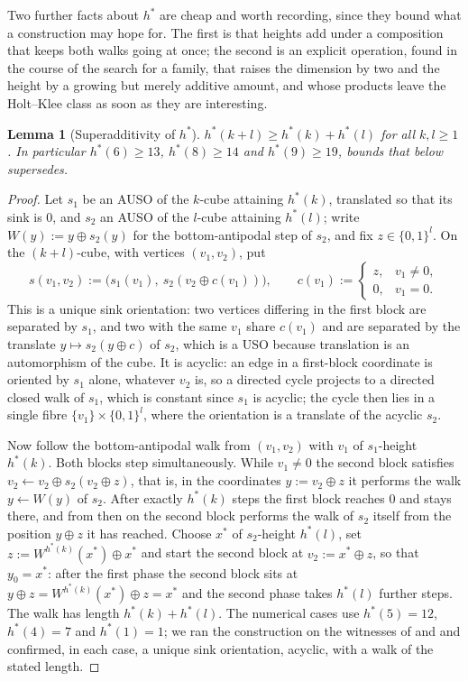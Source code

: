 \documentclass[11pt]{article}
\theoremstyle{plain}
\newtheorem{lemma}[theorem]{Lemma}
\theoremstyle{definition}
\begin{document}
Two further facts about $h^{\ast}$ are cheap and worth recording, since
they bound what a construction may hope for. The first is that heights add
under a composition that keeps both walks going at once; the second is an
explicit operation, found in the course of the search for a family, that
raises the dimension by two and the height by a growing but merely
additive amount, and whose products leave the Holt--Klee class as soon as
they are interesting.

\begin{lemma}[Superadditivity of $h^{\ast}$]\label{lem:hstar-super}
$h^{\ast}(k+l)\ge h^{\ast}(k)+h^{\ast}(l)$ for all $k,l\ge1$. In particular
$h^{\ast}(6)\ge13$, $h^{\ast}(8)\ge14$ and $h^{\ast}(9)\ge19$, bounds that
 below supersedes.
\end{lemma}

\begin{proof}
Let $s_1$ be an AUSO of the $k$-cube attaining $h^{\ast}(k)$, translated so
that its sink is $0$, and $s_2$ an AUSO of the $l$-cube attaining
$h^{\ast}(l)$; write $W(y):=y\oplus s_2(y)$ for the bottom-antipodal step of
$s_2$, and fix $z\in\{0,1\}^{l}$. On the $(k+l)$-cube, with vertices
$(v_1,v_2)$, put
\[
  s(v_1,v_2):=\bigl(s_1(v_1),\ s_2(v_2\oplus c(v_1))\bigr),\qquad
  c(v_1):=\begin{cases}z,&v_1\ne0,\\0,&v_1=0.\end{cases}
\]
This is a unique sink orientation: two vertices differing in the first
block are separated by $s_1$, and two with the same $v_1$ share $c(v_1)$
and are separated by the translate $y\mapsto s_2(y\oplus c)$ of $s_2$,
which is a USO because translation is an automorphism of the cube. It is
acyclic: an edge in a first-block coordinate is oriented by $s_1$ alone,
whatever $v_2$ is, so a directed cycle projects to a directed closed walk
of $s_1$, which is constant since $s_1$ is acyclic; the cycle then lies in
a single fibre $\{v_1\}\times\{0,1\}^{l}$, where the orientation is a
translate of the acyclic $s_2$.

Now follow the bottom-antipodal walk from $(v_1,v_2)$ with $v_1$ of
$s_1$-height $h^{\ast}(k)$. Both blocks step simultaneously. While
$v_1\ne0$ the second block satisfies $v_2\gets v_2\oplus s_2(v_2\oplus z)$,
that is, in the coordinates $y:=v_2\oplus z$ it performs the walk
$y\gets W(y)$ of $s_2$. After exactly $h^{\ast}(k)$ steps the first block
reaches $0$ and stays there, and from then on the second block performs
the walk of $s_2$ itself from the position $y\oplus z$ it has reached.
Choose $x^{\ast}$ of $s_2$-height $h^{\ast}(l)$, set
$z:=W^{h^{\ast}(k)}(x^{\ast})\oplus x^{\ast}$ and start the second block at
$v_2:=x^{\ast}\oplus z$, so that $y_0=x^{\ast}$: after the first phase the
second block sits at $y\oplus z=W^{h^{\ast}(k)}(x^{\ast})\oplus z=x^{\ast}$
and the second phase takes $h^{\ast}(l)$ further steps. The walk has length
$h^{\ast}(k)+h^{\ast}(l)$. The numerical cases use $h^{\ast}(5)=12$,
$h^{\ast}(4)=7$ and $h^{\ast}(1)=1$; we ran the construction on the
witnesses of  and  and
confirmed, in each case, a unique sink orientation, acyclic, with a walk of
the stated length.
\end{proof}
\end{document}
